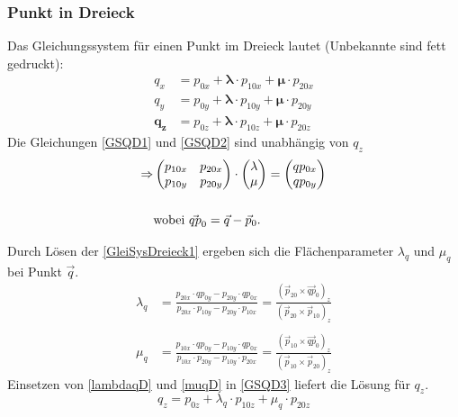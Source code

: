 \subsubsection{Punkt in Dreieck}
Das Gleichungssystem für einen Punkt im Dreieck lautet (Unbekannte sind fett gedruckt):
\begin{align}
	\label{GSQD1} q_{x} &= p_{0x} + \bm{\lambda} \cdot p_{10x} + \bm{\mu} \cdot p_{20x}\\
	\label{GSQD2} q_{y} &= p_{0y} + \bm{\lambda} \cdot p_{10y} + \bm{\mu} \cdot p_{20y} \\
	\label{GSQD3} \bm{q_{z}} &= p_{0z} + \bm{\lambda} \cdot p_{10z} + \bm{\mu} \cdot p_{20z}
\end{align}
Die Gleichungen \ref{GSQD1} und \ref{GSQD2} sind unabhängig von $q_{z}$
\begin{align}
	\label{GleiSysDreieck1}
	\Rightarrow &\begin{pmatrix}p_{10x} & p_{20x} \\ p_{10y} & p_{20y}\end{pmatrix} \cdot \begin{pmatrix}\lambda \\ \mu\end{pmatrix} = \begin{pmatrix}qp_{0x} \\ qp_{0y}\end{pmatrix} \\ \nonumber \\
	\nonumber & \text{wobei } \vec{qp}_{0} = \vec{q} - \vec{p}_{0}.
\end{align}

Durch Lösen der \cref{GleiSysDreieck1} ergeben sich die Flächenparameter $\lambda_{q}$ und  $\mu_{q}$ bei Punkt $\vec{q}$.
\begin{align}
	\label{lambdaqD}
	\lambda_{q} &= \frac{p_{20x} \cdot qp_{0y} - p_{20y} \cdot qp_{0x}}{p_{20x} \cdot p_{10y} - p_{20y} \cdot p_{10x}} = \frac{(\vec{p}_{20} \times \vec{qp}_{0})_{z}}{(\vec{p}_{20} \times \vec{p}_{10})_{z}}
	\\
	\nonumber \\
	\label{muqD}
	\mu_{q} &= \frac{p_{10x} \cdot qp_{0y} - p_{10y} \cdot qp_{0x}}{p_{10x} \cdot p_{20y} - p_{10y} \cdot p_{20x}} = \frac{(\vec{p}_{10} \times \vec{qp}_{0})_{z}}{(\vec{p}_{10} \times \vec{p}_{20})_{z}}
\end{align}
Einsetzen von \cref{lambdaqD} und \cref{muqD} in \cref{GSQD3} liefert die Lösung für $q_{z}$.
\begin{equation}
	\boxed{
		q_{z} = p_{0z} + \lambda_{q} \cdot p_{10z} + \mu_{q} \cdot p_{20z}
	}
\end{equation}
